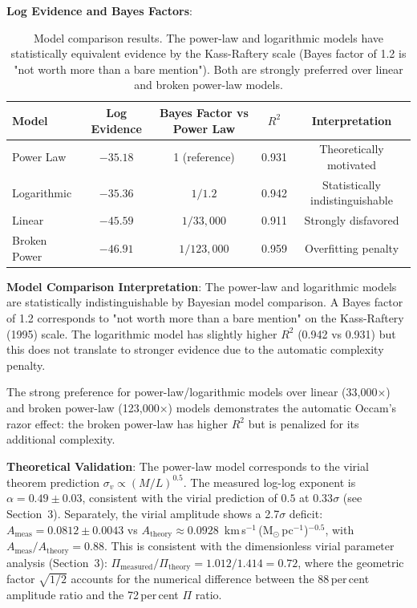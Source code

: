 \documentclass[usenatbib]{rasti}
\begin{document}
\textbf{Log Evidence and Bayes Factors}:
\begin{table}
\centering
\begin{tabular}{lcccc}
\hline
Model & Log Evidence & Bayes Factor vs Power Law & $R^2$ & Interpretation \\
\hline
Power Law & $-35.18$ & 1 (reference) & 0.931 & Theoretically motivated \\
Logarithmic & $-35.36$ & $1/1.2$ & 0.942 & Statistically indistinguishable \\
Linear & $-45.59$ & $1/33,\!000$ & 0.911 & Strongly disfavored \\
Broken Power & $-46.91$ & $1/123,\!000$ & 0.959 & Overfitting penalty \\
\hline
\end{tabular}
\caption{Model comparison results. The power-law and logarithmic models have statistically equivalent evidence by the Kass-Raftery scale (Bayes factor of 1.2 is "not worth more than a bare mention"). Both are strongly preferred over linear and broken power-law models.}
\end{table}

\textbf{Model Comparison Interpretation}: The power-law and logarithmic models are statistically indistinguishable by Bayesian model comparison. A Bayes factor of 1.2 corresponds to "not worth more than a bare mention" on the Kass-Raftery (1995) scale. The logarithmic model has slightly higher $R^2$ (0.942 vs 0.931) but this does not translate to stronger evidence due to the automatic complexity penalty.

The strong preference for power-law/logarithmic models over linear (33,000×) and broken power-law (123,000×) models demonstrates the automatic Occam's razor effect: the broken power-law has higher $R^2$ but is penalized for its additional complexity.

\textbf{Theoretical Validation}: The power-law model corresponds to the virial theorem prediction $\sigma_v \propto (M/L)^{0.5}$. The measured log-log exponent is $\alpha = 0.49 \pm 0.03$, consistent with the virial prediction of $0.5$ at $0.33\sigma$ (see Section~3). Separately, the virial amplitude shows a 2.7$\sigma$ deficit: $A_{\mathrm{meas}} = 0.0812 \pm 0.0043$ vs $A_{\mathrm{theory}} \approx 0.0928$~km\,s$^{-1}$\,(M$_{\odot}$\,pc$^{-1}$)$^{-0.5}$, with $A_{\mathrm{meas}}/A_{\mathrm{theory}} = 0.88$. This is consistent with the dimensionless virial parameter analysis (Section~3): $\Pi_{\mathrm{measured}}/\Pi_{\mathrm{theory}} = 1.012/1.414 = 0.72$, where the geometric factor $\sqrt{1/2}$ accounts for the numerical difference between the 88\,per\,cent amplitude ratio and the 72\,per\,cent $\Pi$ ratio.
\end{document}
